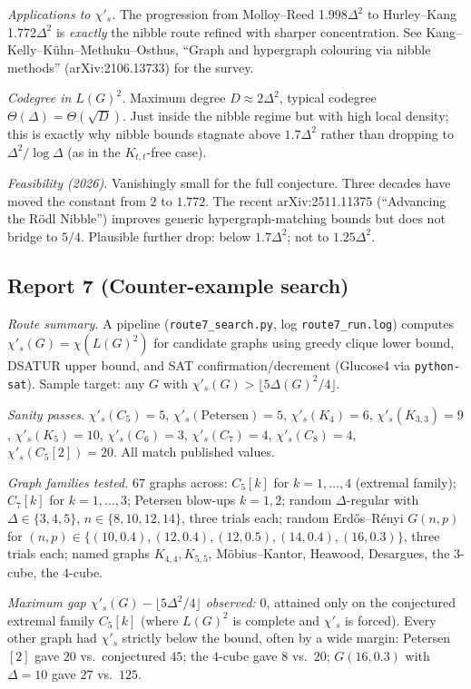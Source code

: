 \documentclass[11pt]{article}
\newcommand{\sci}{\chi'_s}
\begin{document}
\emph{Applications to $\sci$.} The progression from
Molloy--Reed 1.998$\Delta^2$ to Hurley--Kang 1.772$\Delta^2$ is
\emph{exactly} the nibble route refined with sharper concentration.
See Kang--Kelly--K\"uhn--Methuku--Osthus, ``Graph and hypergraph
colouring via nibble methods'' (arXiv:2106.13733) for the survey.

\emph{Codegree in $L(G)^2$.} Maximum degree $D \approx 2\Delta^2$,
typical codegree $\Theta(\Delta) = \Theta(\sqrt{D})$. Just inside the
nibble regime but with high local density; this is exactly why nibble
bounds stagnate above $1.7\Delta^2$ rather than dropping to
$\Delta^2/\log\Delta$ (as in the $K_{t,t}$-free case).

\emph{Feasibility (2026).} Vanishingly small for the full conjecture.
Three decades have moved the constant from $2$ to $1.772$. The
recent arXiv:2511.11375 (``Advancing the R\"odl Nibble'') improves
generic hypergraph-matching bounds but does not bridge to $5/4$.
Plausible further drop: below $1.7\Delta^2$; not to $1.25\Delta^2$.

\subsection*{Report 7 (Counter-example search)}

\emph{Route summary.} A pipeline (\verb|route7_search.py|,
log \verb|route7_run.log|) computes $\sci(G) = \chi(L(G)^2)$ for
candidate graphs using greedy clique lower bound, DSATUR upper
bound, and SAT confirmation/decrement (Glucose4 via
\texttt{python-sat}). Sample target: any $G$ with
$\sci(G) > \lfloor 5\Delta(G)^2/4 \rfloor$.

\emph{Sanity passes.} $\sci(C_5) = 5$, $\sci(\mathrm{Petersen}) = 5$,
$\sci(K_4) = 6$, $\sci(K_{3,3}) = 9$, $\sci(K_5) = 10$,
$\sci(C_6) = 3$, $\sci(C_7) = 4$, $\sci(C_8) = 4$,
$\sci(C_5[2]) = 20$. All match published values.

\emph{Graph families tested.} $67$ graphs across:
$C_5[k]$ for $k = 1, \dots, 4$ (extremal family);
$C_7[k]$ for $k = 1, \dots, 3$;
Petersen blow-ups $k = 1, 2$;
random $\Delta$-regular with $\Delta \in \{3, 4, 5\}$, $n \in \{8, 10, 12, 14\}$, three trials each;
random Erd\H{o}s--R\'enyi $G(n, p)$ for $(n, p) \in \{(10, 0.4),(12,0.4),(12,0.5),(14,0.4),(16,0.3)\}$, three trials each;
named graphs $K_{4,4}, K_{5,5}$, M\"obius--Kantor, Heawood, Desargues, the $3$-cube, the $4$-cube.

\emph{Maximum gap $\sci(G) - \lfloor 5\Delta^2/4 \rfloor$ observed:}
\textbf{$0$}, attained only on the conjectured extremal family
$C_5[k]$ (where $L(G)^2$ is complete and $\sci$ is forced).
Every other graph had $\sci$ strictly below the bound, often by
a wide margin: Petersen$[2]$ gave $20$ vs.\ conjectured $45$;
the $4$-cube gave $8$ vs.\ $20$; $G(16, 0.3)$ with $\Delta = 10$
gave $27$ vs.\ $125$.
\end{document}
